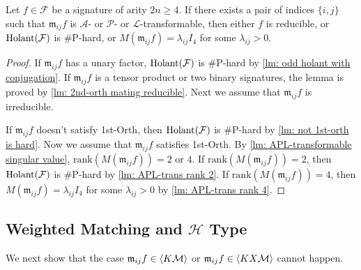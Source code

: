 \begin{lemma}\label{lm: mating is APL-trans implies 2nd-orth}
    Let $f\in \mathcal{\mathcal{F}}$ be a signature of arity $2n\ge 4$.
    If there exists a pair of indices $\{i,j\}$ such that $\mathfrak{m}_{ij}f$ is $\mathscr{A}$- or $\mathscr{P}$- or $\mathscr{L}$-transformable, then either $f$ is reducible, or $\operatorname{Holant}(\mathcal{F})$ is \#P-hard, or $M(\mathfrak{m}_{ij}f)=\lambda_{ij}I_4$ for some $\lambda_{ij}>0.$
\end{lemma}
\begin{proof}
    If $\mathfrak{m}_{ij}f$ has a unary factor, $\operatorname{Holant}(\mathcal{F})$ is \#P-hard by \cref{lm: odd holant with conjugation}.
    If $\mathfrak{m}_{ij}f$ is a tensor product or two binary signatures, the lemma is proved by \cref{lm: 2nd-orth mating reducible}.
    Next we assume that $\mathfrak{m}_{ij}f$ is irreducible.
    
    If $\mathfrak{m}_{ij}f$ doesn't satisfy {\sc 1st-Orth}, then $\operatorname{Holant}(\mathcal{F})$ is \#P-hard by \cref{lm: not 1st-orth is hard}.
    Now we assume that $\mathfrak{m}_{ij}f$ satisfies {\sc 1st-Orth}.
    By \cref{lm: APL-transformable singular value}, $\mathrm{rank}(M(\mathfrak{m}_{ij}f))=2$ or $4$.
    If $\mathrm{rank}(M(\mathfrak{m}_{ij}f))=2$, then $\operatorname{Holant}(\mathcal{F})$ is \#P-hard by \cref{lm: APL-trans rank 2}.
    If $\mathrm{rank}(M(\mathfrak{m}_{ij}f))=4$, then $M(\mathfrak{m}_{ij}f)=\lambda_{ij}I_4$ for some $\lambda_{ij}>0$ by \cref{lm: APL-trans rank 4}.
\end{proof}

\subsection{Weighted Matching and $\mathscr{H}$ Type}


We next show that the case $\mathfrak{m}_{ij}f\in \braket{K\mathcal{M}}$ or $\mathfrak{m}_{ij}f\in \braket{KX\mathcal{M}}$ cannot happen.

